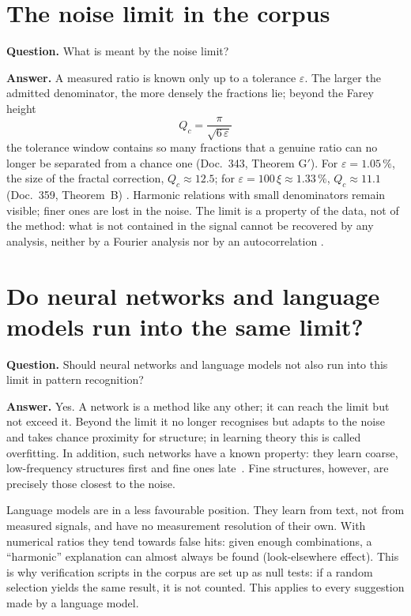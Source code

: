 \section{The noise limit in the corpus}

\textbf{Question.} What is meant by the noise limit?

\textbf{Answer.} A measured ratio is known only up to a tolerance $\varepsilon$. The larger the
admitted denominator, the more densely the fractions lie; beyond the Farey height
\[
  Q_c=\frac{\pi}{\sqrt{6\,\varepsilon}}
\]
the tolerance window contains so many fractions that a genuine ratio can no longer be separated from a
chance one (Doc.~343, Theorem G$'$). For $\varepsilon=1.05\,\%$, the size of the fractal correction,
$Q_c\approx12.5$; for $\varepsilon=100\,\xi\approx1.33\,\%$, $Q_c\approx11.1$ (Doc.~359, Theorem~B)
\KM. Harmonic relations with small denominators remain visible; finer ones are lost in the noise. The
limit is a property of the data, not of the method: what is not contained in the signal cannot be
recovered by any analysis, neither by a Fourier analysis nor by an autocorrelation \BM.

\section{Do neural networks and language models run into the same limit?}

\textbf{Question.} Should neural networks and language models not also run into this limit in pattern
recognition?

\textbf{Answer.} Yes. A network is a method like any other; it can reach the limit but not exceed it.
Beyond the limit it no longer recognises but adapts to the noise and takes chance proximity for
structure; in learning theory this is called overfitting. In addition, such networks have a known
property: they learn coarse, low-frequency structures first and fine ones late
\QM\,\cite{Rahaman2019}. Fine structures, however, are precisely those closest to the noise.

Language models are in a less favourable position. They learn from text, not from measured signals,
and have no measurement resolution of their own. With numerical ratios they tend towards false hits:
given enough combinations, a \enquote{harmonic} explanation can almost always be found (look-elsewhere
effect). This is why verification scripts in the corpus are set up as null tests: if a random
selection yields the same result, it is not counted. This applies to every suggestion made by a
language model.

